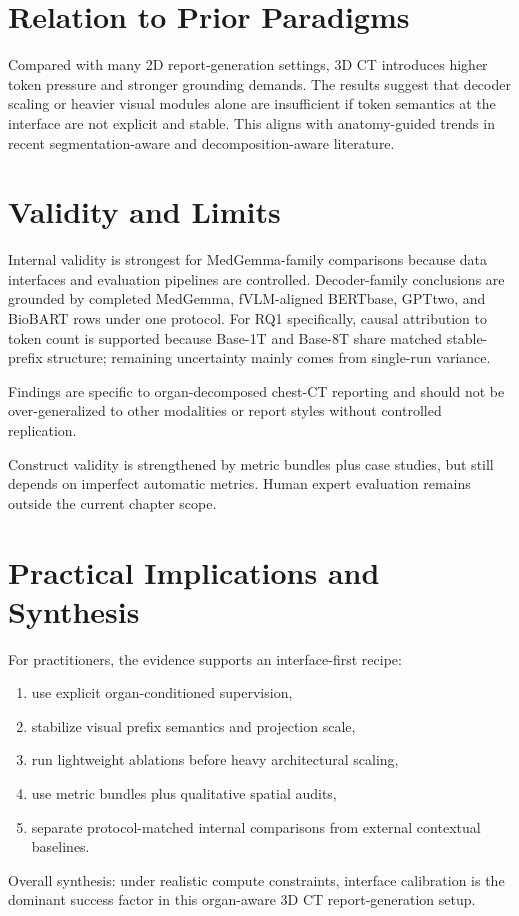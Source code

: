 \section{Relation to Prior Paradigms}
Compared with many 2D report-generation settings, 3D CT introduces higher token pressure and stronger grounding demands. The results suggest that decoder scaling or heavier visual modules alone are insufficient if token semantics at the interface are not explicit and stable. This aligns with anatomy-guided trends in recent segmentation-aware and decomposition-aware literature.

\section{Validity and Limits}
Internal validity is strongest for MedGemma-family comparisons because data interfaces and evaluation pipelines are controlled. Decoder-family conclusions are grounded by completed MedGemma, fVLM-aligned \ac{BERTbase}, \ac{GPTtwo}, and BioBART rows under one protocol.
For RQ1 specifically, causal attribution to token count is supported because Base-1T and Base-8T share matched stable-prefix structure; remaining uncertainty mainly comes from single-run variance.

Findings are specific to organ-decomposed chest-CT reporting and should not be over-generalized to other modalities or report styles without controlled replication.

Construct validity is strengthened by metric bundles plus case studies, but still depends on imperfect automatic metrics. Human expert evaluation remains outside the current chapter scope.

\section{Practical Implications and Synthesis}
For practitioners, the evidence supports an interface-first recipe:
\begin{enumerate}
    \item use explicit organ-conditioned supervision,
    \item stabilize visual prefix semantics and projection scale,
    \item run lightweight ablations before heavy architectural scaling,
    \item use metric bundles plus qualitative spatial audits,
    \item separate protocol-matched internal comparisons from external contextual baselines.
\end{enumerate}

Overall synthesis: under realistic compute constraints, interface calibration is the dominant success factor in this organ-aware 3D CT report-generation setup.
